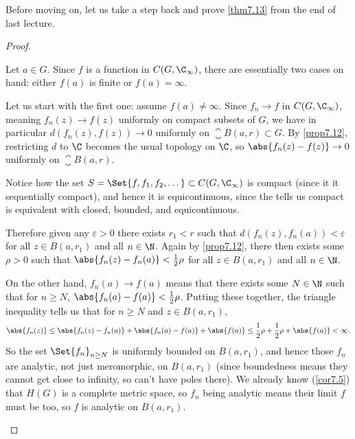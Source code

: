 


Before moving on, let us take a step back and prove \autoref{thm7.13} from the end of last lecture.

\begin{proof}
	\begin{items}
		\item Let $a \in G$.
		Since $f$ is a function in $C(G, \C_\infty)$, there are essentially two cases on hand: either $f(a)$ is finite or $f(a) = \infty$.

		Let us start with the first one: assume $f(a) \neq \infty$.
		Since $f_n \to f$ in $C(G, \C_\infty)$, meaning $f_n(z) \to f(z)$ uniformly on compact subsets of $G$, we have in particular $d(f_n(z), f(z)) \to 0$ uniformly on $\closure{B(a, r)} \subset G$.
		By \autoref{prop7.12}, restricting $d$ to $\C$ becomes the usual topology on $\C$, so $\abs{f_n(z) - f(z)} \to 0$ uniformly on $\closure{B(a, r)}$.

		Notice how the set $S = \Set{f, f_1, f_2, \dots} \subset C(G, \C_\infty)$ is compact (since it it sequentially compact), and hence it is equicontinuous, since the  tells us compact is equivalent with closed, bounded, and equicontinuous.

		Therefore given any $\varepsilon > 0$ there exists $r_1 < r$ such that $d(f_n(z), f_n(a)) < \varepsilon$ for all $z \in B(a, r_1)$ and all $n \in \N$.
		Again by \autoref{prop7.12}, there then exists some $\rho > 0$ such that $\abs{f_n(z) - f_n(a)} < \frac{1}{2} \rho$ for all $z \in B(a, r_1)$ and all $n \in \N$.

		On the other hand, $f_n(a) \to f(a)$ means that there exists some $N \in \N$ such that for $n \geq N$, $\abs{f_n(a) - f(a)} < \frac{1}{2} \rho$.
		Putting these together, the triangle inequality tells us that for $n \geq N$ and $z \in B(a, r_1)$,
		\[
			\abs{f_n(z)} \leq \abs{f_n(z) - f_n(a)} + \abs{f_n(a) - f(a)} + \abs{f(a)} \leq \frac{1}{2} \rho + \frac{1}{2} \rho + \abs{f(a)} < \infty.
		\]
		So the set $\Set{f_n}_{n \geq N}$ is uniformly bounded on $B(a, r_1)$, and hence those $f_n$ are analytic, not just meromorphic, on $B(a, r_1)$ (since boundedness means they cannot get close to infinity, so can't have poles there).
		We already know (\autoref{cor7.5}) that $H(G)$ is a complete metric space, so $f_n$ being analytic means their limit $f$ must be too, so $f$ is analytic on $B(a, r_1)$.


\end{items}
\end{proof}
